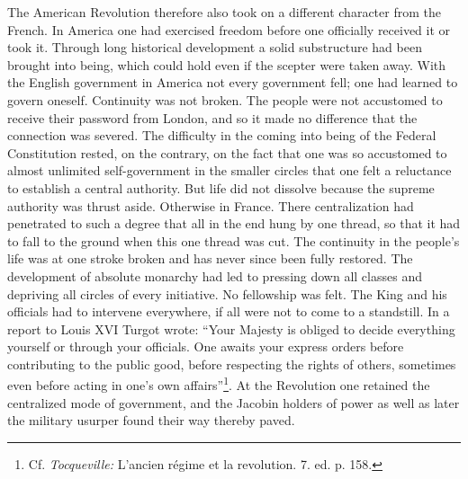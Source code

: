\documentclass[12pt,a4paper,openany]{book}
\newcommand{\opage}[1]{\marginnote{\footnotesize\textit{[#1]}}}
\begin{document}
The American Revolution therefore also took on a different
character from the French. In America one had exercised
freedom before one officially received it or took it. Through
long historical development a solid substructure had been brought
into being, which could hold even if the scepter were taken away. With
the English government in America not every government fell;
one had learned to govern oneself. Continuity was not
broken. The people were not accustomed to receive their password from London,
and so it made no difference that the connection was severed.
The difficulty in the coming into being of the Federal Constitution rested, on the contrary,
on the fact that one was so accustomed to almost unlimited
self-government in the smaller circles that one felt a reluctance to
establish a central authority. But life did not dissolve because
the supreme authority was thrust aside. Otherwise in France.
There centralization had penetrated to such a degree that all
\opage{119}in the end hung by one thread, so that it had to fall to the ground
when this one thread was cut. The continuity in the people's
life was at one stroke broken and has never since been fully
restored. The development of absolute monarchy
had led to pressing down all classes and depriving all circles
of every initiative. No fellowship was felt. The King and his
officials had to intervene everywhere, if all were not to
come to a standstill. In a report to Louis XVI Turgot wrote:
``Your Majesty is obliged to decide everything yourself or through your
officials. One awaits your express orders before
contributing to the public good, before respecting the rights of others,
sometimes even before acting in one's own affairs''\footnote{Cf. \emph{Tocqueville:} L'ancien régime et la revolution. 7. ed. p. 158.}.
At the Revolution one retained the centralized
mode of government, and the Jacobin holders of power as well as later the
military usurper found their way thereby paved.
\end{document}

